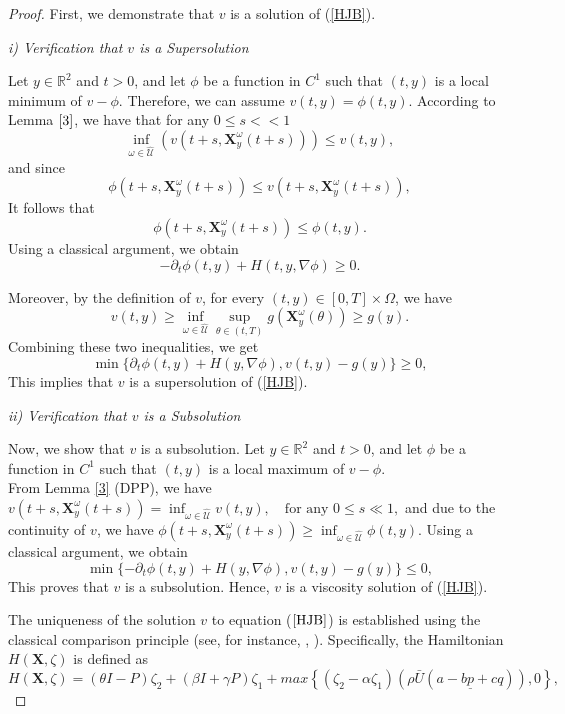 \documentclass[]{interact}
\theoremstyle{plain}%
\theoremstyle{definition}
\theoremstyle{remark}
\begin{document}
\begin{proof}
First, we demonstrate that \( v \) is a solution of (\ref{HJB}).

\textit{i) Verification that \( v \) is a Supersolution}

Let $y \in \mathbb{R}^2$ and $t > 0$, and let $\phi$ be a function in \( C^1 \) such that \((t, y)\) is a local minimum of \( v - \phi \). Therefore, we can assume \( v(t, y) = \phi(t, y) \). According to Lemma $\ref{3}$, we have that for any $ 0 \leq s << 1 $
\[
\inf_{\omega\in \hat{\mathcal{U}}} \left( v(t+s, \mathbf{X}_y^{\omega}(t+s))\right)  \leq v(t, y),
\]
and since
\[
\phi(t+s, \mathbf{X}_y^{\omega}(t+s)) \leq v(t+s, \mathbf{X}_y^{\omega}(t+s)),
\]
It follows that
\[
\phi(t+s, \mathbf{X}_y^{\omega}(t+s)) \leq \phi(t, y).
\]
Using a classical argument, we obtain
\[
-\partial_{t} \phi(t,y) + H(t, y, \nabla \phi) \geq 0.
\]

Moreover, by the definition of \( v \), for every \((t, y) \in [0, T] \times \Omega\), we have
\[
v(t, y) \geq \inf_{\omega\in \hat{\mathcal{U}}
} \sup_{\theta \in (t, T)} g(\mathbf{X}_y^\omega(\theta)) \geq g(y).
\]
Combining these two inequalities, we get
\[
\min \{\partial_{t} \phi (t,y) + H(y, \nabla \phi), v(t, y) - g(y)\} \geq 0,
\]
This implies that \( v \) is a supersolution of (\ref{HJB}).

\textit{ii) Verification that \( v \) is a Subsolution}

Now, we show that \( v \) is a subsolution. Let \( y \in \mathbb{R}^2 \) and \( t > 0 \), and let \( \phi \) be a function in \( C^1 \) such that \((t, y)\) is a local maximum of \( v - \phi \).\\
From Lemma \ref{3} (DPP), we have 
$v(t+s, \mathbf{X}_y^{\omega}(t+s)) = \displaystyle\inf_{\omega\in \hat{\mathcal{U}}} v(t, y), \quad \text{for any } 0 \leq s \ll 1,
$
and due to the continuity of \( v \), we have
$
\phi(t+s, \mathbf{X}_y^{\omega}(t+s)) \geq \displaystyle\inf_{\omega \in \hat{\mathcal{U}}} \phi(t, y).
$
Using a classical argument, we obtain
\[
\min \{-\partial_{t} \phi(t,y) + H(y, \nabla \phi), v(t, y) - g(y)\} \leq 0,
\]
This proves that \( v \) is a subsolution. Hence, \( v \) is a viscosity solution of (\ref{HJB}).

The uniqueness of the solution \( v \) to equation (\(\ref{HJB}\)) is established using the classical comparison principle (see, for instance, \cite{barles1994solutions}, \cite{altarovici2013general}). Specifically, the Hamiltonian \( H(\mathbf{X}, \zeta) \) is defined as
\[
H(\mathbf{X}, \zeta) = (\theta I - P)    \zeta_2 + (\beta I + \gamma P )  \zeta_1  + max \left\{ (\zeta_2 - \alpha \zeta_1) (\rho \bar{U} (a-b \underline{p} +cq)), 0 \right\},
\]


\end{proof}
\end{document}

